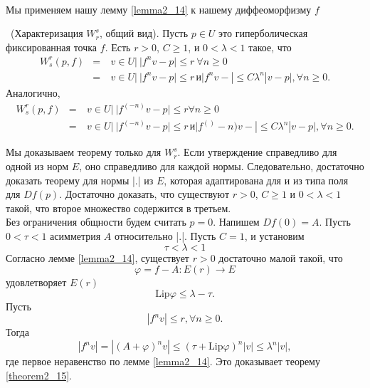 \\ 
Мы применяем нашу лемму \ref{lemma2_14} к нашему диффеоморфизму $f$
\begin{theorem}
\label{theorem2_15} \ (Характеризация $W_r^s$, общий вид). Пусть $p \in U$ это гиперболическая фиксированная точка $f$. Есть $r > 0$, $C \geqslant 1$, и $0 < \lambda < 1$ такое, что
$$
\begin{array}{rclll}
W_s^r(p,f) & = & \ {v \in U | \ |f^n v - p| \leqslant r \ \forall n \geqslant 0 } \\
                   & = & \ {v \in U | \ |f^n v - p| \leqslant r \, и |f^n v - | \leqslant C \lambda^n|v - p|, \forall n \geqslant 0}.
\end{array} 
$$
Аналогично,
$$
\begin{array}{rclll}
W_s^r(p,f)         & = & \ {v \in U | \ |f^(-n) v - p| \leqslant r  \forall n \geqslant 0} \\
                   & = & \ {v \in U | \ |f^(-n) v - p| \leqslant r \, и |f^()-n) v - | \leqslant C \lambda^n|v - p|, \forall n \geqslant 0}.
\end{array} 
$$
\end{theorem}
\begin{demo}
Мы доказываем теорему только для $W_r^s$. Если утверждение справедливо для одной из норм $E$, оно справедливо для каждой нормы. Следовательно, достаточно доказать теорему для нормы |.| из $E$, которая адаптирована для и из типа поля для $Df(p)$. Достаточно доказать, что существуют $r > 0$, $C \geqslant 1$ и $ 0 < \lambda < 1$ такой, что второе множество содержится в третьем.
\\ Без ограничения общности будем считать $p = 0$. Напишем $Df(0) = A$. Пусть $0 < \tau < 1$ асимметрия $A$ относительно |.|. Пусть $C = 1$, и установим
$$
\tau < \lambda < 1
$$
Согласно лемме \ref{lemma2_14}, существует $r >0$ достаточно малой такой, что 
$$
\varphi = f - A : E(r) \to E
$$
удовлетворяет $E(r)$
$$
 \mathrm{Lip} \varphi \leqslant \lambda - \tau.
$$
Пусть
$$
|f^n v| \leqslant r, \forall n \geqslant 0.
$$
Тогда
$$
|f^n v| = |(A + \varphi)^n v| \leqslant (\tau +  \mathrm{Lip} \varphi)^n |v| \leqslant \lambda^n |v|,
$$
где первое неравенство по лемме \ref{lemma2_14}. Это доказывает теорему \ref{theorem2_15}.
\end{demo}

